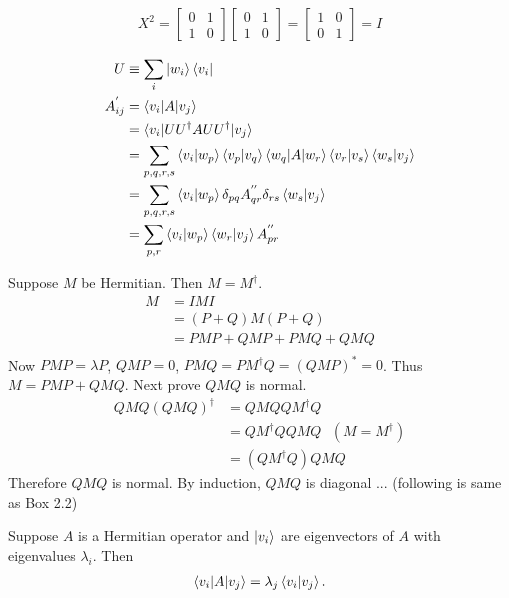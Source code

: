 \begin{align*}
	X^2 = \begin{bmatrix}
		0 & 1 \\ 
		1 & 0
	\end{bmatrix}
	\begin{bmatrix}
		0 & 1 \\ 
		1 & 0
	\end{bmatrix}
	= \begin{bmatrix}
		1 & 0 \\ 
		0 & 1
	\end{bmatrix} = I
\end{align*}



\begin{align*}
	U &\equiv \sum_i \ket{w_i}\bra{v_i}\\
	A_{ij}^{'} &= \braket{v_i | A | v_j}\\
	&= \braket{v_i | UU^\dagger A UU^\dagger | v_j}\\
	&= \sum_{p,q,r,s} \braket{v_i | w_p} \braket{v_p | v_q} \braket{w_q | A | w_r} \braket{v_r | v_s} \braket{w_s | v_j}\\
	&= \sum_{p,q,r,s} \braket{v_i | w_p} \delta_{pq} A_{qr}^{''} \delta_{rs}  \braket{w_s | v_j}\\
	&= \sum_{p,r}  \braket{v_i | w_p}  \braket{w_r | v_j} A_{pr}^{''}
\end{align*}


Suppose $M$ be Hermitian. Then $M = M^\dagger$.
\begin{align*}
	M &= IMI\\
		&= (P+Q) M (P+Q)\\
		&= PMP + QMP + PMQ + QMQ\\
\end{align*}
Now $PMP = \lambda P$, $QMP = 0$, $PMQ = PM^\dagger Q = (QMP)^* = 0$.
Thus $M = PMP + QMQ$.
Next prove $QMQ$ is normal.
\begin{align*}
	QMQ (QMQ)^\dagger &= QMQ QM^\dagger Q\\
		&= QM^\dagger Q QMQ ~~~ (M = M^\dagger)\\
		&= (QM^\dagger Q) QMQ
\end{align*}
Therefore $QMQ$ is normal.
By induction, $QMQ$ is diagonal ... (following is same as Box 2.2)

Suppose $A$ is a Hermitian operator and $\ket{v_i}$ are eigenvectors of $A$ with eigenvalues $\lambda_i$.
Then
\begin{align*}
	\braket{v_i | A | v_j} = \lambda_j \braket{v_i | v_j}.
\end{align*}

